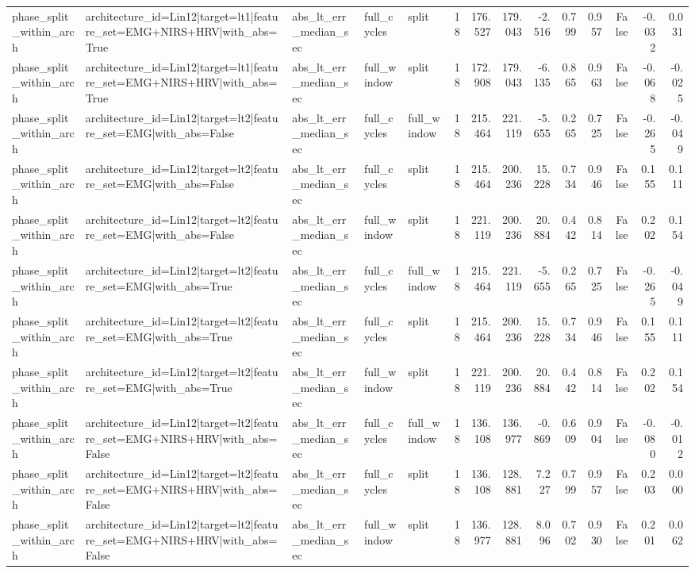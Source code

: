 \begin{table}
\begin{tabular}{lllllrrrrrrrrr}
phase_split_within_arch & architecture_id=Lin12|target=lt1|feature_set=EMG+NIRS+HRV|with_abs=True & abs_lt_err_median_sec & full_cycles & split & 18 & 176.527 & 179.043 & -2.516 & 0.799 & 0.957 & False & -0.032 & 0.031 \\
phase_split_within_arch & architecture_id=Lin12|target=lt1|feature_set=EMG+NIRS+HRV|with_abs=True & abs_lt_err_median_sec & full_window & split & 18 & 172.908 & 179.043 & -6.135 & 0.865 & 0.963 & False & -0.068 & -0.025 \\
phase_split_within_arch & architecture_id=Lin12|target=lt2|feature_set=EMG|with_abs=False & abs_lt_err_median_sec & full_cycles & full_window & 18 & 215.464 & 221.119 & -5.655 & 0.265 & 0.725 & False & -0.265 & -0.049 \\
phase_split_within_arch & architecture_id=Lin12|target=lt2|feature_set=EMG|with_abs=False & abs_lt_err_median_sec & full_cycles & split & 18 & 215.464 & 200.236 & 15.228 & 0.734 & 0.946 & False & 0.155 & 0.111 \\
phase_split_within_arch & architecture_id=Lin12|target=lt2|feature_set=EMG|with_abs=False & abs_lt_err_median_sec & full_window & split & 18 & 221.119 & 200.236 & 20.884 & 0.442 & 0.814 & False & 0.202 & 0.154 \\
phase_split_within_arch & architecture_id=Lin12|target=lt2|feature_set=EMG|with_abs=True & abs_lt_err_median_sec & full_cycles & full_window & 18 & 215.464 & 221.119 & -5.655 & 0.265 & 0.725 & False & -0.265 & -0.049 \\
phase_split_within_arch & architecture_id=Lin12|target=lt2|feature_set=EMG|with_abs=True & abs_lt_err_median_sec & full_cycles & split & 18 & 215.464 & 200.236 & 15.228 & 0.734 & 0.946 & False & 0.155 & 0.111 \\
phase_split_within_arch & architecture_id=Lin12|target=lt2|feature_set=EMG|with_abs=True & abs_lt_err_median_sec & full_window & split & 18 & 221.119 & 200.236 & 20.884 & 0.442 & 0.814 & False & 0.202 & 0.154 \\
phase_split_within_arch & architecture_id=Lin12|target=lt2|feature_set=EMG+NIRS+HRV|with_abs=False & abs_lt_err_median_sec & full_cycles & full_window & 18 & 136.108 & 136.977 & -0.869 & 0.609 & 0.904 & False & -0.080 & -0.012 \\
phase_split_within_arch & architecture_id=Lin12|target=lt2|feature_set=EMG+NIRS+HRV|with_abs=False & abs_lt_err_median_sec & full_cycles & split & 18 & 136.108 & 128.881 & 7.227 & 0.799 & 0.957 & False & 0.203 & 0.000 \\
phase_split_within_arch & architecture_id=Lin12|target=lt2|feature_set=EMG+NIRS+HRV|with_abs=False & abs_lt_err_median_sec & full_window & split & 18 & 136.977 & 128.881 & 8.096 & 0.702 & 0.930 & False & 0.201 & 0.062 \\

\end{tabular}
\end{table}
